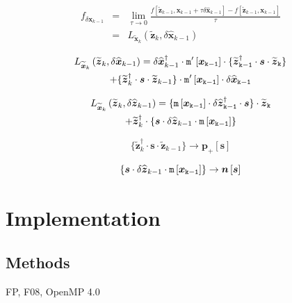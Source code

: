 \documentclass[letterpaper,twocolumn,amsmath,amsfont,amssymb,english,aps,jcp,preprintnumbers,groupaddress,nofootinbib,tightenlines]{revtex4}
\newcommand{\mat}[1]{\boldsymbol{#1}}
\begin{document}
\begin{eqnarray}
f_{\delta \mat{x}_{k-1}} &=& \lim_{\tau \rightarrow 0} \frac{ f [ \widetilde{\mat{z}}_{k-1}, \mat{x}_{k-1} + \tau \delta \widehat{\mat{x}}_{k-1} ]
-f [ \widetilde{\mat{z}}_{k-1}, \mat{x}_{k-1} ]  }{\tau} \nonumber  \\[0.1cm] 
&=&{L}_{\widetilde{\mat{x}}_k}\left(\widetilde{\mat{z}}_{k} , \delta \widehat{\mat{x}}_{k-1} \right)  
\end{eqnarray}

\begin{multline}
{L}_{\widetilde{\mat{x}}_k}\left(\widetilde{\mat{z}}_{k} , \delta \widehat{\mat{x}}_{k-1} \right) 
= \delta \widehat{\mat{x}}^\dagger_{k-1} \cdot   \tt{m}'\left[\mat{x}_{k-1} \right] \cdot 
\{\widetilde{\mat{z}}^\dagger_{k-1}  \cdot \mat{s} \cdot \widetilde{\mat{z}}_{k} \}  \\
+ \{ \widetilde{\mat{z}}^\dagger_{k} \cdot \mat{s} \cdot  \widetilde{\mat{z}}_{k-1} \} 
\cdot \tt{m}'\left[\mat{x}_{k-1} \right]  \cdot \delta \widehat{\mat{x}}_{k-1} 
\end{multline}

\begin{multline}
{L}_{\widetilde{\mat{x}}_k}\left(\widetilde{\mat{z}}_{k} , \delta \widehat{\mat{z}}_{k-1} \right) = 
\{ \tt{m}\left[\mat{x}_{k-1} \right]  \cdot \delta {\widehat{\mat{z}}}^\dagger_{k-1} 
 \cdot \mat{s} \} \cdot \widetilde{\mat{z}}_{k} \\
+\widetilde{\mat{z}}^\dagger_{k} \cdot \{ \mat{s} \cdot \delta {\widehat{\mat{z}}}_{k-1}
\cdot \tt{m}\left[\mat{x}_{k-1} \right]    \} 
\end{multline}

\begin{equation}
 \{ \widetilde{\mat{z}}^\dagger_{k} \cdot \mat{s} \cdot  \widetilde{\mat{z}}_{k-1} \} 
\rightarrow \mat{p}_+\left[\mat{s} \right]
\end{equation}

\begin{equation}
\{ \mat{s} \cdot \delta {\widehat{\mat{z}}}_{k-1}
\cdot \tt{m}\left[\mat{x}_{k-1} \right]    \} 
\rightarrow \mat{n}\left[\mat{s} \right]
\end{equation}

\section{Implementation}

\subsection{Methods}
FP, F08, OpenMP 4.0
\end{document}
